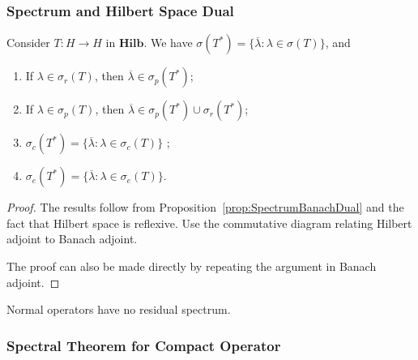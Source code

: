 \subsubsection{Spectrum and Hilbert Space Dual}

\begin{proposition}
	\label{prop:SpectrumHilbertDual}
	Consider $T: H \to H$ in $\mathbf{Hilb}$. We have $\sigma(T^*) = \{\overline{\lambda} : \lambda \in \sigma(T)\} $, and
	\begin{enumerate}
		\item If $\lambda \in \sigma_r(T)$, then $\overline{\lambda}  \in \sigma_p(T^*)$;
		\item If $\lambda \in \sigma_p(T)$, then $\overline{\lambda}  \in \sigma_p(T^*) \cup \sigma_r(T^*)$;
		\item $\sigma_c(T^*) = \{\overline{\lambda} : \lambda \in \sigma_c(T)\} $ ;
		\item $\sigma_e(T^*) = \{\overline{\lambda} : \lambda \in \sigma_e(T)\} $.
	\end{enumerate}
\end{proposition}
\begin{proof}
	The results follow from Proposition~\ref{prop:SpectrumBanachDual} and the fact that Hilbert space is reflexive. Use the commutative diagram relating Hilbert adjoint to Banach adjoint.

	The proof can also be made directly by repeating the argument in Banach adjoint.
\end{proof}


\begin{proposition}
	\label{prop:NormalResidualSpectrum}
	Normal operators have no residual spectrum.
\end{proposition}


\subsubsection{Spectral Theorem for Compact Operator}


